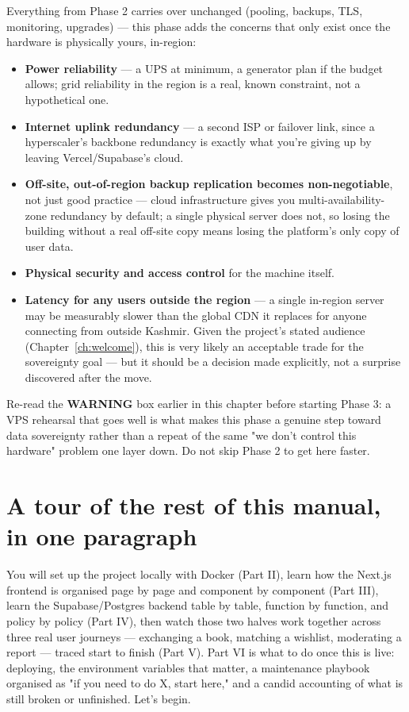 Everything from Phase 2 carries over unchanged (pooling, backups, TLS, monitoring, upgrades) — this phase adds the concerns that only exist once the hardware is physically yours, in-region:

\begin{itemize}
  \item \textbf{Power reliability} — a UPS at minimum, a generator plan if the budget allows; grid reliability in the region is a real, known constraint, not a hypothetical one.
  \item \textbf{Internet uplink redundancy} — a second ISP or failover link, since a hyperscaler's backbone redundancy is exactly what you're giving up by leaving Vercel/Supabase's cloud.
  \item \textbf{Off-site, out-of-region backup replication becomes non-negotiable}, not just good practice — cloud infrastructure gives you multi-availability-zone redundancy by default; a single physical server does not, so losing the building without a real off-site copy means losing the platform's only copy of user data.
  \item \textbf{Physical security and access control} for the machine itself.
  \item \textbf{Latency for any users outside the region} — a single in-region server may be measurably slower than the global CDN it replaces for anyone connecting from outside Kashmir. Given the project's stated audience (Chapter~\ref{ch:welcome}), this is very likely an acceptable trade for the sovereignty goal — but it should be a decision made explicitly, not a surprise discovered after the move.
\end{itemize}

\begin{olkwarn}
Re-read the \textbf{WARNING} box earlier in this chapter before starting Phase 3: a VPS rehearsal that goes well is what makes this phase a genuine step toward data sovereignty rather than a repeat of the same "we don't control this hardware" problem one layer down. Do not skip Phase 2 to get here faster.
\end{olkwarn}

\section{A tour of the rest of this manual, in one paragraph}

You will set up the project locally with Docker (Part II), learn how the Next.js frontend is organised page by page and component by component (Part III), learn the Supabase/Postgres backend table by table, function by function, and policy by policy (Part IV), then watch those two halves work together across three real user journeys — exchanging a book, matching a wishlist, moderating a report — traced start to finish (Part V). Part VI is what to do once this is live: deploying, the environment variables that matter, a maintenance playbook organised as "if you need to do X, start here," and a candid accounting of what is still broken or unfinished. Let's begin.
